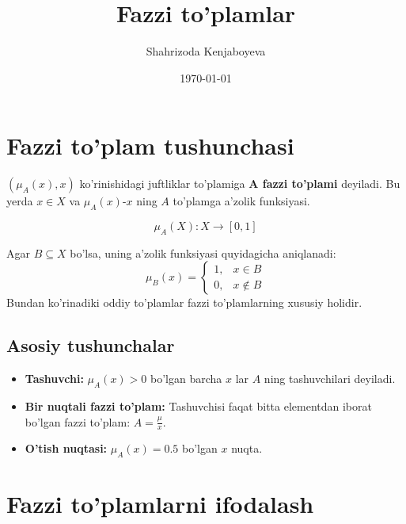 \documentclass[12pt]{article}
\title{Fazzi to'plamlar}
\author{Shahrizoda Kenjaboyeva}
\date{\today}
\begin{document}
	
	\maketitle
	
	\section{Fazzi to'plam tushunchasi}
	
	$(\mu_A(x), x)$ ko'rinishidagi juftliklar to'plamiga \textbf{A fazzi to'plami} deyiladi.
	Bu yerda $x \in X$ va $\mu_A(x)$-$x$ ning $A$ to'plamga a'zolik funksiyasi.
	
	\[\mu_A(X): X \to [0, 1]\]
	
	Agar $B \subseteq X$ bo'lsa, uning a'zolik funksiyasi quyidagicha aniqlanadi:
	\[\mu_B(x)=
	\begin{cases}
		1, & x\in B \\
		0, & x\notin B
	\end{cases}\]
	Bundan ko'rinadiki oddiy to'plamlar fazzi to'plamlarning xususiy holidir.
	
	\subsection{Asosiy tushunchalar}
	
	\begin{itemize}
		\item \textbf{Tashuvchi:} $\mu_A(x)>0$ bo'lgan barcha $x$ lar $A$ ning tashuvchilari deyiladi.
		\item \textbf{Bir nuqtali fazzi to'plam:} Tashuvchisi faqat bitta elementdan iborat bo'lgan fazzi to'plam: $A=\frac{\mu}{x}$.
		\item \textbf{O'tish nuqtasi:} $\mu_A(x)=0.5$ bo'lgan $x$ nuqta.
	\end{itemize}
	
	\section{Fazzi to'plamlarni ifodalash}
	
\end{document}
